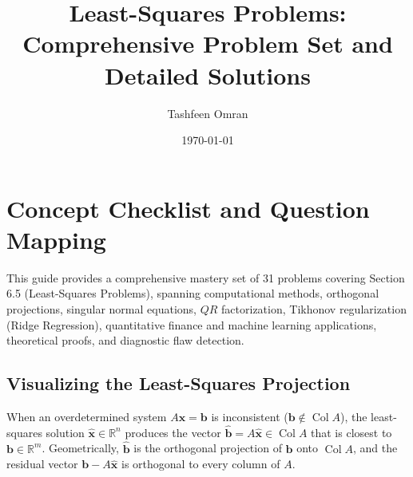 \documentclass[11pt, letterpaper]{article}
\title{Least-Squares Problems: Comprehensive Problem Set and Detailed Solutions}
\author{Tashfeen Omran}
\date{\today}
\theoremstyle{definition}
\theoremstyle{remark}
\begin{document}
\maketitle
\tableofcontents
\newpage

\section{Concept Checklist and Question Mapping}

This guide provides a comprehensive mastery set of 31 problems covering Section 6.5 (Least-Squares Problems), spanning computational methods, orthogonal projections, singular normal equations, $QR$ factorization, Tikhonov regularization (Ridge Regression), quantitative finance and machine learning applications, theoretical proofs, and diagnostic flaw detection.

\subsection{Visualizing the Least-Squares Projection}

When an overdetermined system $A\mathbf{x} = \mathbf{b}$ is inconsistent ($\mathbf{b} \notin \operatorname{Col} A$), the least-squares solution $\hat{\mathbf{x}} \in \mathbb{R}^n$ produces the vector $\hat{\mathbf{b}} = A\hat{\mathbf{x}} \in \operatorname{Col} A$ that is closest to $\mathbf{b} \in \mathbb{R}^m$. Geometrically, $\hat{\mathbf{b}}$ is the orthogonal projection of $\mathbf{b}$ onto $\operatorname{Col} A$, and the residual vector $\mathbf{b} - A\hat{\mathbf{x}}$ is orthogonal to every column of $A$.
\end{document}
